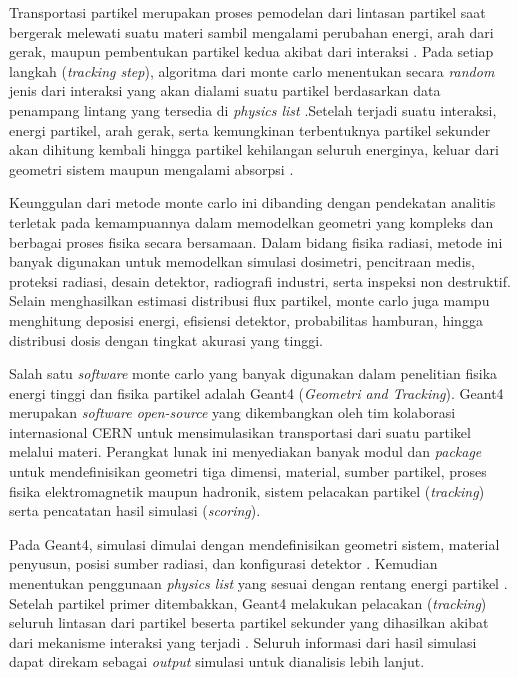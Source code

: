 \documentclass[12pt,a4paper]{report}
\begin{document}
Transportasi partikel merupakan proses pemodelan dari lintasan partikel saat bergerak melewati suatu materi sambil mengalami perubahan energi, arah dari gerak, maupun pembentukan partikel kedua akibat dari interaksi \cite{alghamdi2022geant4}. Pada setiap langkah (\textit{tracking step}), algoritma dari monte carlo menentukan secara \textit{random} jenis dari interaksi yang akan 
dialami suatu partikel berdasarkan data penampang lintang yang tersedia di \textit{physics list} \cite{agma2025simulasi}.Setelah terjadi suatu interaksi, energi partikel, arah gerak, serta kemungkinan terbentuknya partikel sekunder akan dihitung kembali hingga partikel kehilangan seluruh energinya, keluar dari geometri sistem maupun mengalami absorpsi \cite{agma2025simulasi}.

Keunggulan dari metode monte carlo ini dibanding dengan pendekatan analitis terletak pada kemampuannya dalam memodelkan geometri yang kompleks dan berbagai proses fisika secara bersamaan. Dalam bidang fisika radiasi, metode ini banyak digunakan untuk memodelkan simulasi dosimetri, pencitraan medis, proteksi radiasi, desain detektor, radiografi industri, 
serta inspeksi non destruktif. Selain menghasilkan estimasi distribusi flux partikel, monte carlo juga mampu menghitung deposisi energi, efisiensi detektor, probabilitas hamburan, hingga distribusi dosis dengan tingkat akurasi yang tinggi.

Salah satu \textit{software} monte carlo yang banyak digunakan dalam penelitian fisika energi tinggi dan fisika partikel adalah Geant4 (\textit{Geometri and Tracking}). Geant4 merupakan \textit{software open-source} yang dikembangkan oleh tim kolaborasi internasional CERN untuk mensimulasikan transportasi dari suatu partikel melalui materi. Perangkat lunak ini 
menyediakan banyak modul dan \textit{package} untuk mendefinisikan geometri tiga dimensi, material, sumber partikel, proses fisika elektromagnetik maupun hadronik, sistem pelacakan partikel (\textit{tracking}) serta pencatatan hasil simulasi (\textit{scoring}).

Pada Geant4, simulasi dimulai dengan mendefinisikan geometri sistem, material penyusun, posisi sumber radiasi, dan konfigurasi detektor \cite{agma2025simulasi}. Kemudian menentukan penggunaan \textit{physics list} yang sesuai dengan rentang energi partikel \cite{rizani2012simulasi}. Setelah partikel primer ditembakkan, Geant4 melakukan pelacakan (\textit{tracking}) seluruh lintasan dari partikel beserta partikel 
sekunder yang dihasilkan akibat dari mekanisme interaksi yang terjadi \cite{agma2025simulasi}. Seluruh informasi dari hasil simulasi dapat direkam sebagai \textit{output} simulasi untuk dianalisis lebih lanjut.
\end{document}
